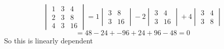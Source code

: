 \documentclass[12pt,letterpaper]{article}
\theoremstyle{definition}
\begin{document}
\begin{changemargin}{.5cm}{0cm}
\begin{enumerate}[label=(\alph*)]
\begin{equation*}
\begin{vmatrix}
            1 &  3 & 4\\
            2 &  3 & 8\\
            4 &  3 & 16
        \end{vmatrix}=
        1\begin{vmatrix}
            3 & 8\\
            3 & 16
        \end{vmatrix}
        -2\begin{vmatrix}
            3 & 4\\
            3 & 16
        \end{vmatrix}
        +4\begin{vmatrix}
            3 & 4\\
            3 & 8
        \end{vmatrix}
    \end{equation*}
    \begin{equation*}
    = 48-24+ -96+24 + 96-48 = 0 
   \end{equation*}
   So this is linearly dependent 
\end{enumerate}


    \end{changemargin}
\end{document}
